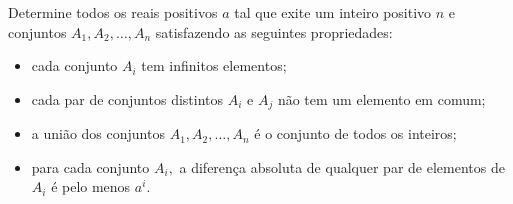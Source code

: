 Determine todos os reais positivos $a$ tal que exite um inteiro positivo $n$ e conjuntos $A_1, A_2, \ldots, A_n$ satisfazendo as seguintes propriedades:

\begin{itemize}
	\item cada conjunto $A_i$ tem infinitos elementos;
	\item cada par de conjuntos distintos $A_i$ e $A_j$ não tem um elemento em comum;
	\item a união dos conjuntos $A_1, A_2, \ldots, A_n$ é o conjunto de todos os inteiros;
	\item para cada conjunto $A_i,$ a diferença absoluta de qualquer par de elementos de $A_i$ é pelo menos $a^i$.
\end{itemize}
